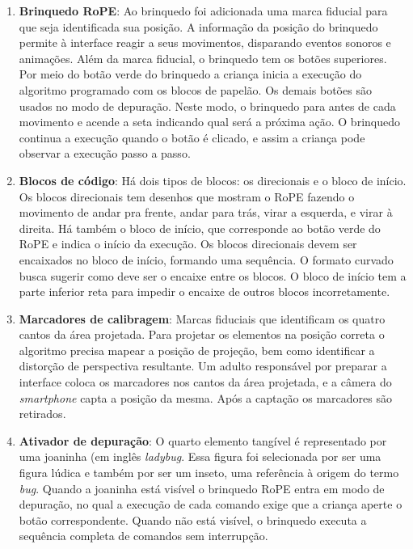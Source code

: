 \begin{enumerate}
\item \textbf{Brinquedo RoPE}: Ao brinquedo foi adicionada uma marca fiducial para que seja identificada sua posição. A informação da posição do brinquedo permite à interface reagir a seus movimentos, disparando eventos sonoros e animações. Além da marca fiducial, o brinquedo tem os botões superiores. Por meio do botão verde do brinquedo a criança inicia a execução do algoritmo programado com os blocos de papelão. Os demais botões são usados no modo de depuração. Neste modo, o brinquedo para antes de cada movimento e acende a seta indicando qual será a próxima ação. O brinquedo continua a execução quando o botão é clicado, e assim a criança pode observar a execução passo a passo.
\item \textbf{Blocos de código}:  Há dois tipos de blocos: os direcionais e o bloco de início. Os blocos direcionais tem desenhos que mostram o RoPE fazendo o movimento de andar pra frente, andar para trás, virar a esquerda, e virar à direita. Há também o bloco de início, que corresponde ao botão verde do RoPE e indica o início da execução. Os blocos direcionais devem ser encaixados no bloco de início, formando uma sequência. O formato curvado busca sugerir como deve ser o encaixe entre os blocos. O bloco de início  tem a parte inferior reta para impedir o encaixe de outros blocos incorretamente.
\item \textbf{Marcadores de calibragem}: Marcas fiduciais que identificam os quatro cantos da área projetada. Para projetar os elementos na posição correta o algoritmo precisa mapear a posição de projeção, bem como identificar a distorção de perspectiva resultante. Um adulto responsável por preparar a interface coloca os marcadores nos cantos da área projetada, e a câmera do \textit{smartphone} capta a posição da mesma. Após a captação os marcadores são retirados.
\item \textbf{Ativador de depuração}: O quarto elemento tangível é representado por uma joaninha (em inglês \textit{ladybug}. Essa figura foi selecionada por ser uma figura lúdica e também por ser um inseto, uma referência à origem do termo \textit{bug}. Quando a joaninha está visível o brinquedo RoPE entra em modo de depuração, no qual a execução de cada comando exige que a criança aperte o botão correspondente. Quando não está visível, o brinquedo executa a sequência completa de comandos sem interrupção.
\end{enumerate}

